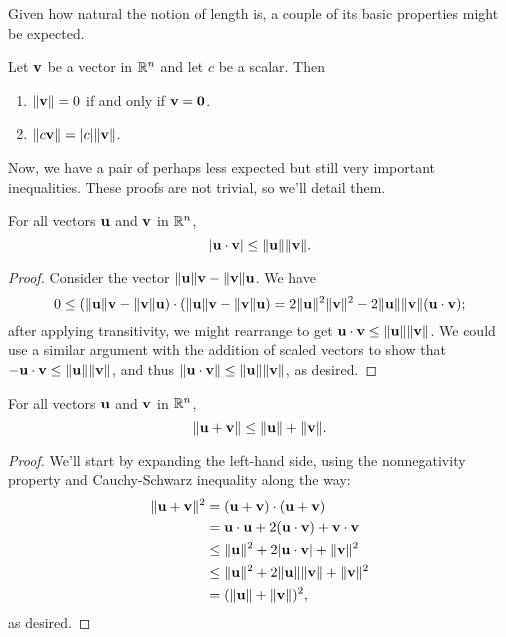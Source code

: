 \documentclass[../m073main.tex]{subfiles}
\begin{document}
Given how natural the notion of length is, a couple of its basic properties might be expected.

\begin{theorem}
	Let $\mathbf{v}$ be a vector in $\mathbb{R}^n$ and let $c$ be a scalar.
	Then
	\begin{enumerate}[label=(\alph*)]
		\item $\|\mathbf{v}\| = 0$ if and only if $\mathbf{v} = \mathbf{0}$.
		\item $\|c \mathbf{v}\| = |c| \|\mathbf{v}\|$.
	\end{enumerate}
\end{theorem}

Now, we have a pair of perhaps less expected but still very important inequalities.
These proofs are not trivial, so we'll detail them.

\begin{theorem}
	For all vectors $\mathbf{u}$ and $\mathbf{v}$ in $\mathbb{R}^n$,
	\[ |\mathbf{u} \cdot \mathbf{v}| \leq \|\mathbf{u}\| \|\mathbf{v}\|. \]
\end{theorem}

\begin{proof}
	Consider the vector $\| \mathbf{u} \| \mathbf{v} - \| \mathbf{v} \| \mathbf{u}$.
	We have
	\[ 0 \leq (\| \mathbf{u} \| \mathbf{v} - \| \mathbf{v} \| \mathbf{u}) \cdot (\| \mathbf{u} \| \mathbf{v} - \| \mathbf{v} \| \mathbf{u}) = 2 \| \mathbf{u} \|^2 \| \mathbf{v} \|^2 - 2 \| \mathbf{u} \| \| \mathbf{v} \| (\mathbf{u} \cdot \mathbf{v}); \]
	after applying transitivity, we might rearrange to get $\mathbf{u} \cdot \mathbf{v} \leq \| \mathbf{u} \|  \| \mathbf{v} \|$.
	We could use a similar argument with the addition of scaled vectors to show that $-\mathbf{u} \cdot \mathbf{v} \leq \| \mathbf{u} \|  \| \mathbf{v} \|$, and thus $\| \mathbf{u} \cdot \mathbf{v} \| \leq \| \mathbf{u} \|  \| \mathbf{v} \|$, as desired.
\end{proof}

\begin{theorem}
	For all vectors $\mathbf{u}$ and $\mathbf{v}$ in $\mathbb{R}^n$,
	\[ \|\mathbf{u} + \mathbf{v}\| \leq \|\mathbf{u}\| + \|\mathbf{v}\|. \]
\end{theorem}

\begin{proof}
	We'll start by expanding the left-hand side, using the nonnegativity property and Cauchy-Schwarz inequality along the way:
	\begin{align*}
		\| \mathbf{u} + \mathbf{v} \|^2 &= (\mathbf{u} + \mathbf{v}) \cdot (\mathbf{u} + \mathbf{v}) \\
		&= \mathbf{u} \cdot \mathbf{u} + 2(\mathbf{u} \cdot \mathbf{v}) + \mathbf{v} \cdot \mathbf{v} \\
		&\leq \| \mathbf{u} \|^2 + 2|\mathbf{u} \cdot \mathbf{v}| + \| \mathbf{v} \|^2 \\
		&\leq \| \mathbf{u} \|^2 + 2 \| \mathbf{u} \|  \| \mathbf{v} \| + \| \mathbf{v} \|^2 \\
		&= (\| \mathbf{u} \| + \| \mathbf{v} \|)^2,
	\end{align*}
	as desired.
\end{proof}
\end{document}
